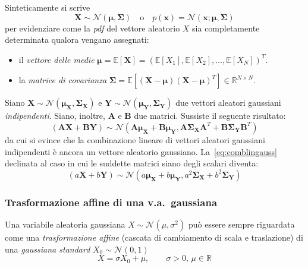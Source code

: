 \noindent Sinteticamente si scrive 
\[
    \mathbf{X} \sim \mathcal{N}(\bm{\mu}, \mathbf{\Sigma}) \quad\text{o}\quad p(\mathbf{x})=\mathcal{N}(\mathbf{x};\bm{\mu}, \mathbf{\Sigma})
\]
per evidenziare come la \emph{pdf} del vettore aleatorio $X$ sia completamente determinata qualora vengano assegnati: 
\begin{itemize}
    \item il \emph{vettore delle medie} $\bm{\mu}=\mathbb{E}[\mathbf{X}]=(\mathbb{E}[X_1],\mathbb{E}[X_2],\dots,\mathbb{E}[X_N])^T$.
    \item la \emph{matrice di covarianza} $\mathbf{\Sigma}= \mathbb{E}[(\mathbf{X}-\bm{\mu})(\mathbf{X}-\bm{\mu})^T]\in \mathbb{R}^{N \times N}$.
\end{itemize} 
\smallskip
\begin{oss}\label{oss:comb_lin_normali}
    Siano $\mathbf{X}\sim\mathcal{N}(\bm{\mu}_{\mathbf{X}}, \bm{\Sigma}_{\mathbf{X}})$ e 
    $\mathbf{Y}\sim\mathcal{N}(\bm{\mu}_{\mathbf{Y}}, \bm{\Sigma}_{\mathbf{Y}})$ due vettori aleatori gaussiani \emph{indipendenti}. Siano, inoltre,
    $\bm{A}$ e $\bm{B}$ due matrici. Sussiste il seguente risultato:
    \begin{equation}
     (\bm{A}\mathbf{X}+\bm{B}\mathbf{Y}) \sim \mathcal{N}(\bm{A}\bm{\mu}_{\mathbf{X}} +\bm{B}\bm{\mu}_{\mathbf{Y}}, \bm{A}\bm{\Sigma}_{\mathbf{X}}\bm{A}^T+\bm{B}\bm{\Sigma}_{\mathbf{Y}}\bm{B}^T) \label{eq:comblingauss}
    \end{equation}
    da cui si evince che la combinazione lineare di vettori aleatori gaussiani indipendenti è ancora un vettore aleatorio gaussiano.
    La~\eqref{eq:comblingauss} declinata al caso in cui le suddette matrici siano degli scalari diventa:
    \begin{equation}
        (a\mathbf{X}+b\mathbf{Y}) \sim \mathcal{N}(a\bm{\mu}_{\mathbf{X}} +b\bm{\mu}_{\mathbf{Y}}, a^2\bm{\Sigma}_{\mathbf{X}}+b^2\bm{\Sigma}_{\mathbf{Y}})\label{eq:comblingauss_scalar}
    \end{equation}
\end{oss}

\subsubsection{Trasformazione affine di una v.a.\ gaussiana}
\label{sssec:Reparametrization_Trick}


\begin{Mybox}
    Una variabile aleatoria gaussiana $X \sim \mathcal{N}(\mu, \sigma^2)$ può essere sempre riguardata come
    una \emph{trasformazione affine} (cascata di cambiamento di scala e traslazione) di una 
    \emph{gaussiana standard} $X_0 \sim \mathcal{N}(0, 1)$
    \begin{equation}
        X = \sigma X_0 + \mu,  \qquad \sigma>0, \, \mu \in \mathbb{R} \label{eq:rep_trick}
    \end{equation}
\end{Mybox}
